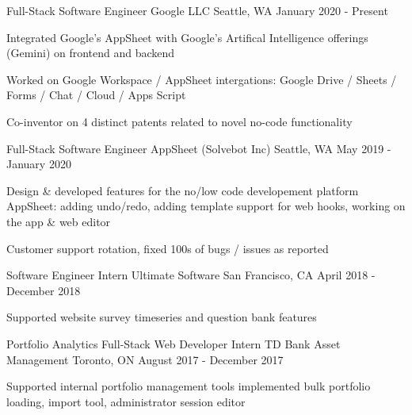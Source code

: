 

\addvspace{1ex}

\begin{cventries}

\cventry
{Full-Stack Software Engineer} %
{Google LLC} %
{Seattle, WA} %
{January 2020 - Present} %
{ %
\begin{cvitems}
\item {Integrated Google's AppSheet with Google's Artifical Intelligence offerings (Gemini) on frontend and backend}
\item {Worked on Google Workspace / AppSheet intergations: Google Drive / Sheets / Forms / Chat / Cloud / Apps Script}
\item {Co-inventor on 4 distinct patents related to novel no-code functionality}
\end{cvitems}
}

\cventry
{Full-Stack Software Engineer} %
{AppSheet (Solvebot Inc)} %
{Seattle, WA} %
{May 2019 - January 2020} %
{ %
\begin{cvitems}
\item {Design \& developed features for the no/low code developement platform AppSheet: adding undo/redo, adding template support for web hooks, working on the app \& web editor}
\item {Customer support rotation, fixed 100s of bugs / issues as reported}
\end{cvitems}
}

\cventry
{Software Engineer Intern} %
{Ultimate Software} %
{San Francisco, CA} %
{April 2018 - December 2018} %
{ %
\begin{cvitems}
\item {Supported website survey timeseries and question bank features}
\end{cvitems}
}

\cventry
{Portfolio Analytics Full-Stack Web Developer Intern} %
{TD Bank Asset Management} %
{Toronto, ON} %
{August 2017 - December 2017} %
{ %
\begin{cvitems}
\item {Supported internal portfolio management tools implemented bulk portfolio loading, import tool, administrator session editor}
\end{cvitems}
}


\end{cventries}
